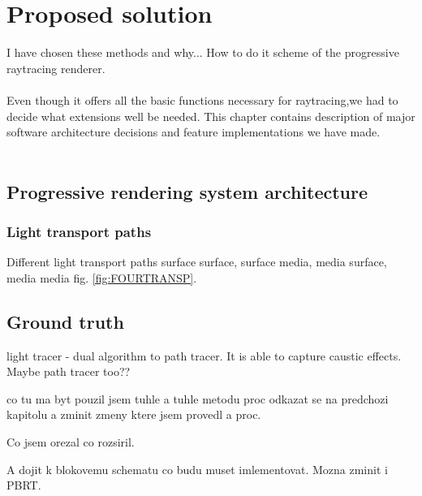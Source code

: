 \chapter{Proposed solution}
\label{chap:PROPOSAL}
I have chosen these methods and why... How to do it scheme of the progressive raytracing renderer.
\\
\\
Even though it offers all the basic functions necessary for raytracing,we had to decide what extensions well be needed. This chapter contains description of major software architecture decisions and feature implementations we have made.
\\
\\
\section{Progressive rendering system architecture}


\subsection{Light transport paths}
Different light transport paths surface surface, surface media, media surface, media media fig. \ref{fig:FOURTRANSP}.


\section{Ground truth}
light tracer - dual algorithm to path tracer. It is able to capture caustic effects. Maybe path tracer too??

co tu ma byt
pouzil jsem tuhle a tuhle metodu proc odkazat se na predchozi kapitolu a zminit zmeny ktere jsem provedl a proc.

Co jsem orezal co rozsiril.

A dojit k blokovemu schematu co budu muset imlementovat. Mozna zminit i PBRT. 



